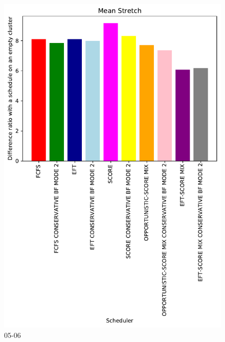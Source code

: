 \documentclass[a4paper]{article}
\begin{document}
\begin{figure}\includegraphics[width=0.9\linewidth]{MBSS/plot/Results_FCFS_Score_Backfill_2022-05-06->2022-05-06_V10000_Mean_Stretch_450_128_32_256_4_1024.pdf}\caption{05-06}\end{figure}
\end{document}
